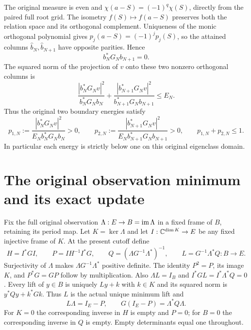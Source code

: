 The original measure is even and
$\chi(a-S)=(-1)^q\chi(S)$, directly from the paired full root grid.
The isometry $f(S)\mapsto f(a-S)$ preserves both the relation space
and its orthogonal complement. Uniqueness of the monic orthogonal
polynomial gives $p_j(a-S)=(-1)^jp_j(S)$, so the attained columns
$\widehat b_N,\widehat b_{N+1}$ have opposite parities. Hence
\begin{equation}\label{a04oid:oid:parity}
 b_N^*G_Nb_{N+1}=0.
\end{equation}
The squared norm of the projection of $v$ onto these two nonzero
orthogonal columns is
\[
 \frac{|b_N^*G_Nv|^2}{b_N^*G_Nb_N}
 +\frac{|b_{N+1}^*G_Nv|^2}{b_{N+1}^*G_Nb_{N+1}}\le E_N.
\]
Thus the original two boundary energies satisfy
\begin{equation}\label{a04oid:oid:energies}
 p_{1,N}:=\frac{|b_N^*G_Nv|^2}{E_Nb_N^*G_Nb_N}>0,\qquad
 p_{2,N}:=\frac{|b_{N+1}^*G_Nv|^2}{E_Nb_{N+1}^*G_Nb_{N+1}}>0,
 \qquad p_{1,N}+p_{2,N}\le1.
\end{equation}
In particular each energy is strictly below one on this original
eigenclass domain.

\section{The original observation minimum and its exact update}

Fix the full original observation $\Lambda:E\to B=\operatorname{im}\Lambda$
in a fixed frame of $B$, retaining its period map. Let $K=\ker\Lambda$
and let $I:\mathbb C^{\dim K}\to E$ be any fixed injective frame of $K$.
At the present cutoff define
\begin{equation}\label{a04oid:oid:observation}
 H=I^*GI,\qquad P=IH^{-1}I^*G,\qquad
 Q=(\Lambda G^{-1}\Lambda^*)^{-1},\qquad
 L=G^{-1}\Lambda^*Q:B\to E.
\end{equation}
Surjectivity of $\Lambda$ makes $\Lambda G^{-1}\Lambda^*$
positive definite. The identity $P^2=P$, its image $K$, and
$P^*G=GP$ follow by multiplication. Also $\Lambda L=I_B$ and
$I^*GL=I^*\Lambda^*Q=0$. Every lift of $y\in B$ is uniquely
$Ly+k$ with $k\in K$ and its squared norm is
$y^*Qy+k^*Gk$. Thus $L$ is the actual unique minimum lift and
\begin{equation}\label{a04oid:oid:quotient}
 L\Lambda=I_E-P,\qquad
 G(I_E-P)=\Lambda^*Q\Lambda.
\end{equation}
For $K=0$ the corresponding inverse in $H$ is empty and $P=0$;
for $B=0$ the corresponding inverse in $Q$ is empty. Empty
determinants equal one throughout.


